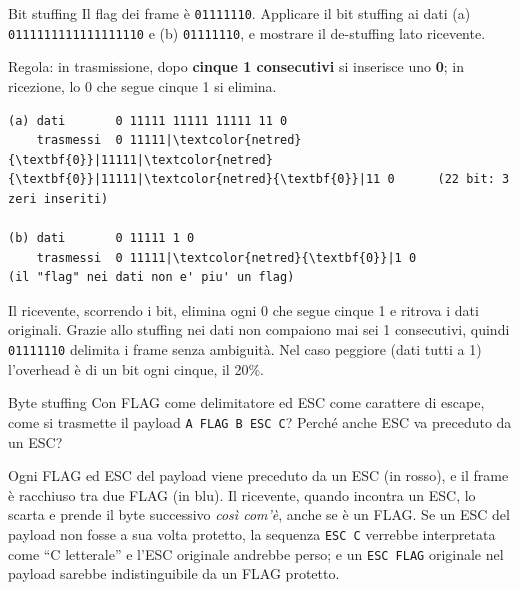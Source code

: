 \begin{esercizio}{Bit stuffing}
Il flag dei frame è \texttt{01111110}. Applicare il bit stuffing ai dati (a) \texttt{0111111111111111110} e (b) \texttt{01111110}, e
mostrare il de-stuffing lato ricevente.
\end{esercizio}

\svolgimento
Regola: in trasmissione, dopo \textbf{cinque 1 consecutivi} si inserisce uno \textbf{0}; in ricezione, lo 0 che segue cinque 1 si elimina.
\begin{lstlisting}[autogobble=false, escapechar=|]
(a) dati       0 11111 11111 11111 11 0
    trasmessi  0 11111|\textcolor{netred}{\textbf{0}}|11111|\textcolor{netred}{\textbf{0}}|11111|\textcolor{netred}{\textbf{0}}|11 0      (22 bit: 3 zeri inseriti)

(b) dati       0 11111 1 0
    trasmessi  0 11111|\textcolor{netred}{\textbf{0}}|1 0                   (il "flag" nei dati non e' piu' un flag)
\end{lstlisting}
Il ricevente, scorrendo i bit, elimina ogni 0 che segue cinque 1 e ritrova i dati originali. Grazie allo stuffing nei dati non
compaiono mai sei 1 consecutivi, quindi \texttt{01111110} delimita i frame senza ambiguità. Nel caso peggiore (dati tutti a 1)
l'overhead è di un bit ogni cinque, il 20\%.

\begin{esercizio}{Byte stuffing}
Con FLAG come delimitatore ed ESC come carattere di escape, come si trasmette il payload \texttt{A FLAG B ESC C}? Perché anche ESC va
preceduto da un ESC?
\end{esercizio}

\svolgimento
\begin{center}
\end{center}
Ogni FLAG ed ESC del payload viene preceduto da un ESC (in rosso), e il frame è racchiuso tra due FLAG (in blu). Il ricevente,
quando incontra un ESC, lo scarta e prende il byte successivo \emph{così com'è}, anche se è un FLAG. Se un ESC del payload non fosse
a sua volta protetto, la sequenza \texttt{ESC C} verrebbe interpretata come ``C letterale'' e l'ESC originale andrebbe perso; e un
\texttt{ESC FLAG} originale nel payload sarebbe indistinguibile da un FLAG protetto.

